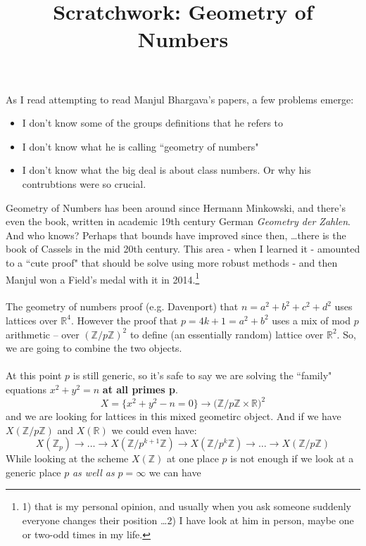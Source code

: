\documentclass[12pt]{article}
\title{Scratchwork: Geometry of Numbers}
\date{}
\begin{document}

\sffamily

\maketitle

\noindent As I read attempting to read Manjul Bhargava's papers, a few problems emerge:
\begin{itemize}
\item I don't know some of the groups definitions that he refers to
\item I don't know what he is calling ``geometry of numbers"
\item I don't know what the big deal is about class numbers.  Or why his contrubtions were so crucial.
\end{itemize}
Geometry of Numbers has been around since Hermann Minkowski, and there's even the book, written in academic 19th century German \textit{Geometry der Zahlen}.  And who knows?  Perhaps that bounds have improved since then, \dots there is the book of Cassels in the mid 20th century.  This area - when I learned it - amounted to a ``cute proof" that should be solve using more robust methods - and then Manjul won a Field's medal with it in 2014.\footnote{1) that is my personal opinion, and usually when you ask someone suddenly everyone changes their position \dots 2) I have look at him in person, maybe one or two-odd times in my life. }\\ \\
The geometry of numbers proof (e.g. Davenport) that $n = a^2 + b^2 + c^2 + d^2$ uses lattices over $\mathbb{R}^4$. However the proof that $p = 4k+1 = a^2 + b^2$ uses a mix of mod $p$ arithmetic -- over $(\mathbb{Z}/p\mathbb{Z})^2$ to define (an essentially random) lattice over $\mathbb{R}^2$.  So, we are going to combine the two objects. \\\\
At this point $p$ is still generic, so it's safe to say we are solving the ``family" equations $x^2 + y^2 = n$ \textbf{at all primes p}.
$$ X = \{ x^2 + y^2 - n = 0 \} \to \big( \mathbb{Z}/p\mathbb{Z} \times \mathbb{R} \big)^2 $$
and we are looking for lattices in this mixed geometirc object.  And if we have $X(\mathbb{Z}/p\mathbb{Z})$ and $X(\mathbb{R})$ we could even have:
$$ X(\mathbb{Z}_p) \to \dots \to X(\mathbb{Z}/p^{k+1}\mathbb{Z}) \to X(\mathbb{Z}/p^k \mathbb{Z}) \to \dots \to X(\mathbb{Z}/p \mathbb{Z})  $$
While looking at the scheme $X(\mathbb{Z})$ at one place $p$ is not enough if we look at a generic place $p$ \textit{as well as} $p = \infty$ we can have
\end{document}
